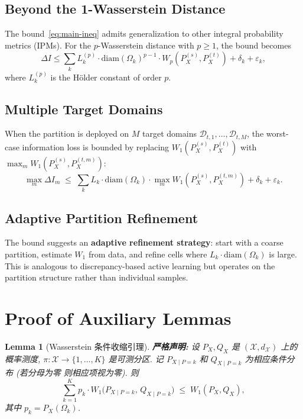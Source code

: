 \documentclass[12pt,a4paper]{article}
\newtheorem{lemma}[theorem]{Lemma}
\newcommand{\cX}{\mathcal{X}}
\newcommand{\cD}{\mathcal{D}}
\newcommand{\Wass}{W_1}
\newcommand{\diam}{\mathrm{diam}}
\begin{document}
\subsection{Beyond the 1-Wasserstein Distance}

The bound~\eqref{eq:main-ineq} admits generalization to other integral
probability metrics (IPMs).  For the $p$-Wasserstein distance with
$p\geq1$, the bound becomes
\begin{equation}\label{eq:p-wasserstein}
    \Delta I \leq \sum_k L_k^{(p)}\cdot\diam(\Omega_k)^{p-1}\cdot
    W_p(P^{(s)}_X,P^{(t)}_X) + \delta_k + \varepsilon_k,
\end{equation}
where $L_k^{(p)}$ is the H\"older constant of order $p$.

\subsection{Multiple Target Domains}

When the partition is deployed on $M$ target domains
$\cD_{t,1},\dots,\cD_{t,M}$, the worst-case information loss is bounded by
replacing $\Wass(P^{(s)}_X,P^{(t)}_X)$ with
$\max_{m}\Wass(P^{(s)}_X,P^{(t,m)}_X)$:
\begin{equation}\label{eq:multi-target}
    \max_{m} \Delta I_m \;\leq\;
    \sum_k L_k\cdot\diam(\Omega_k)\cdot
    \max_{m}\Wass(P^{(s)}_X,P^{(t,m)}_X)
    + \delta_k + \varepsilon_k.
\end{equation}

\subsection{Adaptive Partition Refinement}

The bound suggests an \textbf{adaptive refinement strategy}: start with a
coarse partition, estimate $\Wass$ from data, and refine cells where
$L_k\cdot\diam(\Omega_k)$ is large.  This is analogous to
discrepancy-based active learning but operates on the partition structure
rather than individual samples.

\section{Proof of Auxiliary Lemmas}
\label{sec:lemmas}

\begin{lemma}[Wasserstein 条件收缩引理]\label{lem:wass-conditioning}
\textbf{严格声明:}
设 $P_X, Q_X$ 是 $(\cX,d_{\cX})$ 上的概率测度,
$\pi:\cX\to\{1,\dots,K\}$ 是可测分区. 记
$P_{X\mid P=k}$ 和 $Q_{X\mid P=k}$ 为相应条件分布 (若分母为零
则相应项视为零). 则
\begin{equation}\label{eq:wass-cond}
    \sum_{k=1}^{K} p_k\cdot
    W_1\!\bigl(P_{X\mid P=k},\,Q_{X\mid P=k}\bigr)
    \;\leq\; W_1(P_X, Q_X),
\end{equation}
其中 $p_k = P_X(\Omega_k)$.
\end{lemma}
\end{document}
